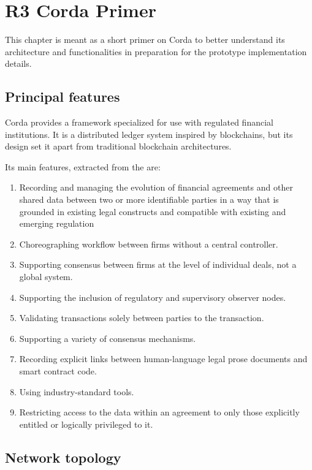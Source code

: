 \chapter{R3 Corda Primer}
\label{chap:corda-analysis}

This chapter is meant as a short primer on Corda to better understand its architecture and functionalities in preparation for the prototype implementation details.

\section{Principal features}

Corda provides a framework specialized for use with regulated financial institutions. It is a distributed ledger system inspired by blockchains, but its design set it apart from traditional blockchain architectures.

Its main features, extracted from the \cite{cordawhitepaper} are:

\begin{enumerate}
    \item Recording and managing the evolution of financial agreements and other
    shared data between two or more identifiable parties in a way that is grounded in existing legal constructs and compatible with existing and emerging regulation
    \item Choreographing workflow between firms without a central controller.
    \item Supporting consensus between firms at the level of individual deals, not a
    global system.
    \item Supporting the inclusion of regulatory and supervisory observer nodes.
    \item Validating transactions solely between parties to the transaction.
    \item Supporting a variety of consensus mechanisms.
    \item Recording explicit links between human-language legal prose documents and smart contract code.
    \item Using industry-standard tools.
    \item Restricting access to the data within an agreement to only those explicitly entitled or logically privileged to it.
\end{enumerate}

\section{Network topology}

